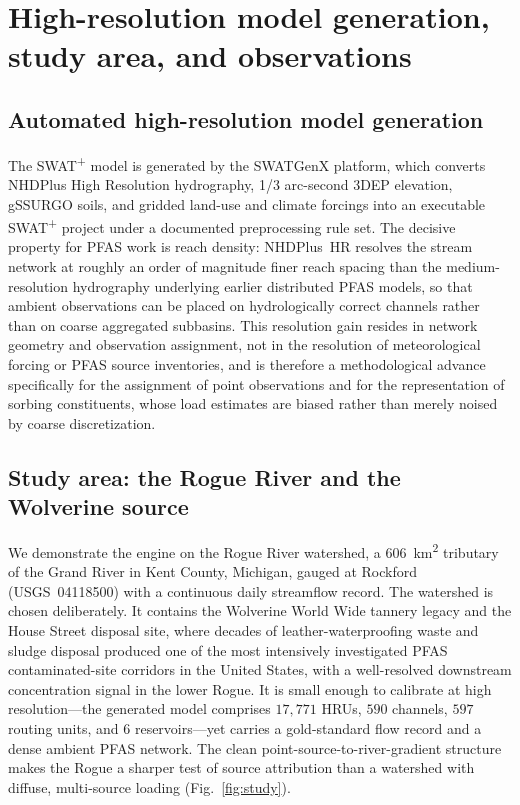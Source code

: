 \section{High-resolution model generation, study area, and observations}\label{sec:model}

\subsection{Automated high-resolution model generation}
The SWAT\textsuperscript{+} model is generated by the SWATGenX platform, which converts NHDPlus High Resolution hydrography, 1/3 arc-second 3DEP elevation, gSSURGO soils, and gridded land-use and climate forcings into an executable SWAT\textsuperscript{+} project under a documented preprocessing rule set. The decisive property for PFAS work is reach density: NHDPlus~HR resolves the stream network at roughly an order of magnitude finer reach spacing than the medium-resolution hydrography underlying earlier distributed PFAS models, so that ambient observations can be placed on hydrologically correct channels rather than on coarse aggregated subbasins. This resolution gain resides in network geometry and observation assignment, not in the resolution of meteorological forcing or PFAS source inventories, and is therefore a methodological advance specifically for the assignment of point observations and for the representation of sorbing constituents, whose load estimates are biased rather than merely noised by coarse discretization.

\subsection{Study area: the Rogue River and the Wolverine source}
We demonstrate the engine on the Rogue River watershed, a $606$~km\textsuperscript{2} tributary of the Grand River in Kent County, Michigan, gauged at Rockford (USGS~04118500) with a continuous daily streamflow record. The watershed is chosen deliberately. It contains the Wolverine World Wide tannery legacy and the House Street disposal site, where decades of leather-waterproofing waste and sludge disposal produced one of the most intensively investigated PFAS contaminated-site corridors in the United States, with a well-resolved downstream concentration signal in the lower Rogue. It is small enough to calibrate at high resolution---the generated model comprises $17{,}771$ HRUs, $590$ channels, $597$ routing units, and $6$ reservoirs---yet carries a gold-standard flow record and a dense ambient PFAS network. The clean point-source-to-river-gradient structure makes the Rogue a sharper test of source attribution than a watershed with diffuse, multi-source loading (Fig.~\ref{fig:study}).

